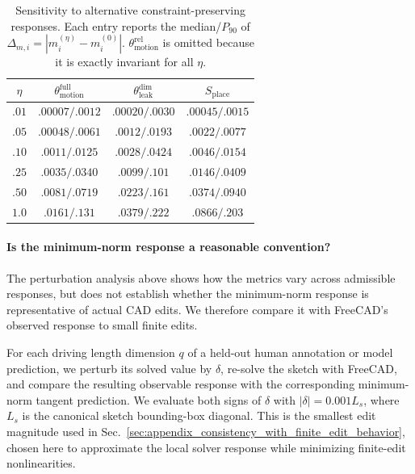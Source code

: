 \begin{table}[t]
    \centering
    \footnotesize
    \setlength{\tabcolsep}{4.0pt}
    \caption{
    Sensitivity to alternative constraint-preserving responses.
    Each entry reports the median/$P_{90}$ of
    $\Delta_{m,i}=|m_i^{(\eta)}-m_i^{(0)}|$.
    $\theta_{\mathrm{motion}}^{\mathrm{rel}}$ is omitted because it is
    exactly invariant for all $\eta$.
    }
    \label{tab:appendix_pseudo_inv_response_sensitivity}
    \begin{tabular}{@{}cccc@{}}
        \toprule
        $\eta$
        & $\theta_{\mathrm{motion}}^{\mathrm{full}}$
        & $\theta_{\mathrm{leak}}^{\mathrm{dim}}$
        & $S_{\mathrm{place}}$ \\
        \midrule
        $.01$ & $.00007/.0012$ & $.00020/.0030$ & $.00045/.0015$ \\
        $.05$ & $.00048/.0061$ & $.0012/.0193$  & $.0022/.0077$ \\
        $.10$ & $.0011/.0125$  & $.0028/.0424$  & $.0046/.0154$ \\
        $.25$ & $.0035/.0340$  & $.0099/.101$   & $.0146/.0409$ \\
        $.50$ & $.0081/.0719$  & $.0223/.161$   & $.0374/.0940$ \\
        $1.0$ & $.0161/.131$   & $.0379/.222$   & $.0866/.203$ \\
        \bottomrule
    \end{tabular}
\end{table}

\paragraph{Is the minimum-norm response a reasonable convention?}
The perturbation analysis above shows how the metrics vary across admissible responses, but does not establish whether the minimum-norm response is representative of actual CAD edits. We therefore compare it with FreeCAD's observed response to small finite edits.

For each driving length dimension $q$ of a held-out human annotation or model prediction, we perturb its solved value by $\delta$, re-solve the sketch with FreeCAD, and compare the resulting observable response with the corresponding minimum-norm tangent prediction. We evaluate both signs of $\delta$ with $|\delta|=0.001L_s$, where $L_s$ is the canonical sketch bounding-box diagonal. This is the smallest edit magnitude used in Sec.~\ref{sec:appendix_consistency_with_finite_edit_behavior}, chosen here to approximate the local solver response while minimizing finite-edit nonlinearities.

